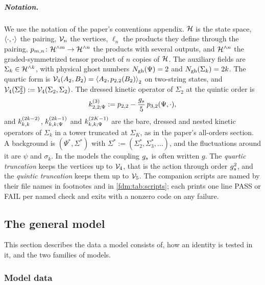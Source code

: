 \subparagraph{Notation.}
We use the notation of the paper's conventions appendix.
$\Hs$ is the state space, $\pair{\cdot}{\cdot}$ the pairing, $\vertex{n}$ the vertices, $\ell_n$ the products they define through the pairing, $\sprod{m}{n} \colon \Hn{m} \to \Hn{n}$ the products with several outputs, and $\Hn{n}$ the graded-symmetrized tensor product of $n$ copies of $\Hs$.
The auxiliary fields are $\Sigma_k \in \Hn{k}$, with physical ghost numbers $\Ngh(\Psi) = 2$ and $\Ngh(\Sigma_k) = 2 k$.
The quartic form is $\vertex{4}(A_2, B_2) = \pair[2]{A_2}{\sprod{2}{2}(B_2)}$ on two-string states, and $\vertex{4}(\Sigma_2^2) := \vertex{4}(\Sigma_2, \Sigma_2)$.
The dressed kinetic operator of $\Sigma_2$ at the quintic order is
\begin{equation}
  \label{fdm:eq:intro:dressed}
  \kin{2}{\Psi}{3}
    := \sprod{2}{2} - \frac{\gs}{5} \, \sprod{3}{2}(\Psi, \cdot),
\end{equation}
and $\kin{k}{}{2 k - 2}$, $\kin{k}{\Psi}{2 k - 1}$ and $\kin{k}{\Psi}{2 K - 1}$ are the bare, dressed and nested kinetic operators of $\Sigma_k$ in a tower truncated at $\Sigma_K$, as in the paper's all-orders section.
A background is $(\Psi^*, \Sigma^*)$ with $\Sigma^* := (\Sigma_2^*, \Sigma_3^*, \dots)$, and the fluctuations around it are $\psi$ and $\sigma_k$.
In the models the coupling $\gs$ is often written $g$.
The \emph{quartic truncation} keeps the vertices up to $\vertex{4}$, that is the action through order $\gs^2$, and the \emph{quintic truncation} keeps them up to $\vertex{5}$.
The companion scripts are named by their file names in footnotes and in \cref{fdm:tab:scripts}; each prints one line PASS or FAIL per named check and exits with a nonzero code on any failure.

\subsection{The general model}
\label{fdm:sec:general}

This section describes the data a model consists of, how an identity is tested in it, and the two families of models.

\subsubsection{Model data}
\label{fdm:sec:general:data}

